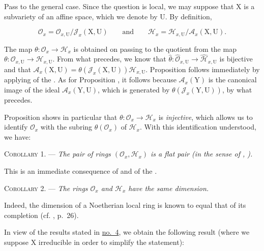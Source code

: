 Pass to the general case. Since the question is local, we may suppose that $\mathrm{X}$ is a subvariety of an affine space, which we denote by $\mathrm{U}$. By definition,

\begin{equation*}
\mathcal{O}_x=\mathcal{O}_{x,\mathrm{U}}/\mathcal{J}_x(\mathrm{X},\mathrm{U})
\qquad\text{and}\qquad
\mathcal{H}_x=\mathcal{H}_{x,\mathrm{U}}/\mathcal{A}_x(\mathrm{X},\mathrm{U}).
\end{equation*}

The map $\theta:\mathcal{O}_x\to\mathcal{H}_x$ is obtained on passing to the quotient from the map $\theta:\mathcal{O}_{x,\mathrm{U}}\to\mathcal{H}_{x,\mathrm{U}}$. From what precedes, we know that $\hat\theta:\hat{\mathcal{O}}_{x,\mathrm{U}}\to\hat{\mathcal{H}}_{x,\mathrm{U}}$ is bijective and that $\mathcal{A}_x(\mathrm{X},\mathrm{U})=\theta(\mathcal{J}_x(\mathrm{X},\mathrm{U}))\mathcal{H}_{x,\mathrm{U}}$. Proposition  follows immediately by applying  of the . As for Proposition , it follows because $\mathcal{A}_x(\mathrm{Y})$ is the canonical image of the ideal $\mathcal{A}_x(\mathrm{Y},\mathrm{U})$, which is generated by $\theta(\mathcal{J}_x(\mathrm{Y},\mathrm{U}))$, by what precedes.

Proposition  shows in particular that $\theta:\mathcal{O}_x\to\mathcal{H}_x$ is \emph{injective}, which allows us to identify $\mathcal{O}_x$ with the subring $\theta(\mathcal{O}_x)$ of $\mathcal{H}_x$. With this identification understood, we have:

\textsc{Corollary 1}. --- \emph{The pair of rings $(\mathcal{O}_x,\mathcal{H}_x)$ is a flat pair (in the sense of , ).}

This is an immediate consequence of  and  of the .

\textsc{Corollary 2}. --- \emph{The rings $\mathcal{O}_x$ and $\mathcal{H}_x$ have the same dimension.}

Indeed, the dimension of a Noetherian local ring is known to equal that of its completion (cf. , p.~26).

In view of the results stated in \hyperref[gaga:no:4]{no.~4}, we obtain the following result (where we suppose $\mathrm{X}$ irreducible in order to simplify the statement):

